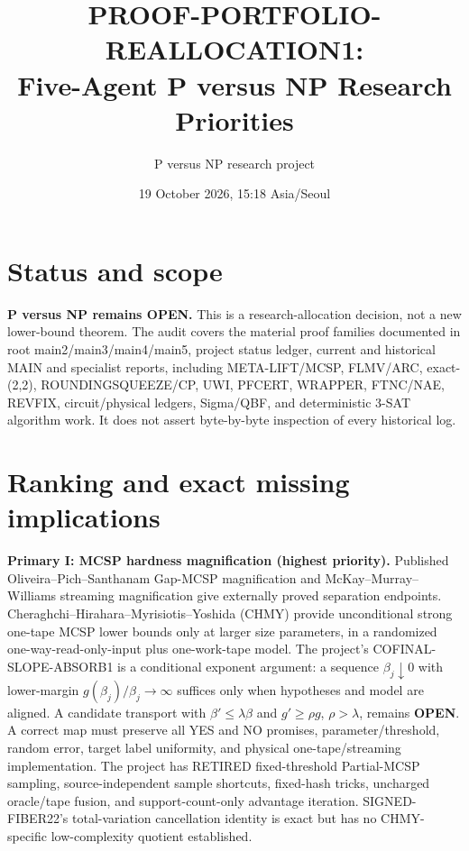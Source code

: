 \documentclass[11pt]{article}
\title{PROOF-PORTFOLIO-REALLOCATION1:\\Five-Agent P versus NP Research Priorities}
\author{P versus NP research project}
\date{19 October 2026, 15:18 Asia/Seoul}
\begin{document}
\maketitle

\section*{Status and scope}
\textbf{P versus NP remains OPEN.}
This is a research-allocation decision, not a new lower-bound theorem. The audit covers the material proof families documented in root main2/main3/main4/main5, project status ledger, current and historical MAIN and specialist reports, including META-LIFT/MCSP, FLMV/ARC, exact-(2,2), ROUNDINGSQUEEZE/CP, UWI, PFCERT, WRAPPER, FTNC/NAE, REVFIX, circuit/physical ledgers, Sigma/QBF, and deterministic 3-SAT algorithm work. It does not assert byte-by-byte inspection of every historical log.

\section*{Ranking and exact missing implications}
\noindent\textbf{Primary I: MCSP hardness magnification (highest priority).}
Published Oliveira--Pich--Santhanam Gap-MCSP magnification and McKay--Murray--Williams streaming magnification give externally proved separation endpoints. Cheraghchi--Hirahara--Myrisiotis--Yoshida (CHMY) provide unconditional strong one-tape MCSP lower bounds only at larger size parameters, in a randomized one-way-read-only-input plus one-work-tape model. The project's COFINAL-SLOPE-ABSORB1 is a conditional exponent argument: a sequence $\beta_j\downarrow0$ with lower-margin $g(\beta_j)/\beta_j\to\infty$ suffices only when hypotheses and model are aligned. A candidate transport with $\beta'\le\lambda\beta$ and $g'\ge\rho g$, $\rho>\lambda$, remains \textbf{OPEN}. A correct map must preserve all YES and NO promises, parameter/threshold, random error, target label uniformity, and physical one-tape/streaming implementation. The project has RETIRED fixed-threshold Partial-MCSP sampling, source-independent sample shortcuts, fixed-hash tricks, uncharged oracle/tape fusion, and support-count-only advantage iteration. SIGNED-FIBER22's total-variation cancellation identity is exact but has no CHMY-specific low-complexity quotient established.
\end{document}
